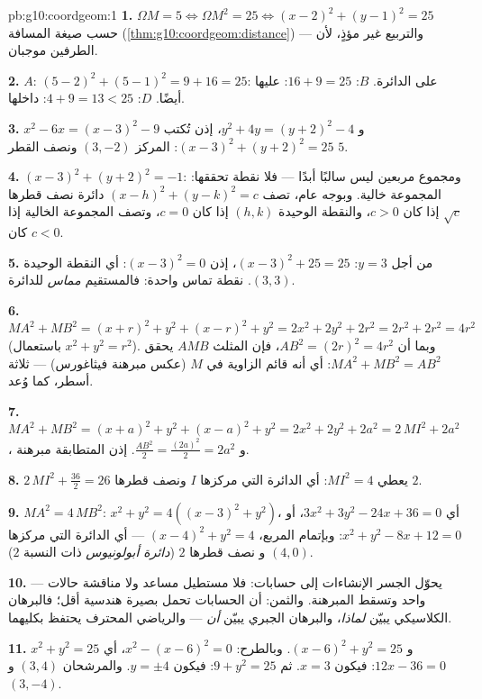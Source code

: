 \begin{solution}{pb:g10:coordgeom:1}
\textbf{1.} $\Omega M = 5 \iff \Omega M^2 = 25 \iff
(x - 2)^2 + (y - 1)^2 = 25$ حسب صيغة المسافة
(\cref{thm:g10:coordgeom:distance}) --- والتربيع غير مؤذٍ،
لأن الطرفين موجبان.

\textbf{2.} $A$: $(5-2)^2 + (5-1)^2 = 9 + 16 = 25$: على
الدائرة. $B$: $16 + 9 = 25$: عليها أيضًا. $D$: $4 + 9 = 13 < 25$:
داخلها.

\textbf{3.} $x^2 - 6x = (x - 3)^2 - 9$ و
$y^2 + 4y = (y + 2)^2 - 4$، إذن تُكتب 
$(x - 3)^2 + (y + 2)^2 = 25$: المركز $(3, -2)$ ونصف القطر $5$.

\textbf{4.} $(x - 3)^2 + (y + 2)^2 = -1$: ومجموع مربعين
ليس سالبًا أبدًا --- فلا نقطة تحققها: المجموعة خالية. وبوجه
عام، تصف $(x - h)^2 + (y - k)^2 = c$ دائرة نصف قطرها
$\sqrt c$ إذا كان $c > 0$، والنقطة الوحيدة $(h, k)$ إذا كان $c = 0$،
وتصف المجموعة الخالية إذا كان $c < 0$.

\textbf{5.} من أجل $y = 3$: $(x - 3)^2 + 25 = 25$، إذن
$(x - 3)^2 = 0$: أي النقطة الوحيدة $(3, 3)$. نقطة تماس واحدة:
فالمستقيم \emph{مماس} للدائرة.

\textbf{6.} $MA^2 + MB^2 = (x + r)^2 + y^2 + (x - r)^2 + y^2
= 2x^2 + 2y^2 + 2r^2 = 2r^2 + 2r^2 = 4r^2$ (باستعمال
$x^2 + y^2 = r^2$). وبما أن $AB^2 = (2r)^2 = 4r^2$، فإن المثلث
$AMB$ يحقق $MA^2 + MB^2 = AB^2$: أي أنه قائم الزاوية في $M$
(عكس مبرهنة فيثاغورس) --- ثلاثة أسطر، كما وُعد.

\textbf{7.} $MA^2 + MB^2 = (x + a)^2 + y^2 + (x - a)^2 + y^2
= 2x^2 + 2y^2 + 2a^2 = 2\,MI^2 + 2a^2$، و
$\frac{AB^2}{2} = \frac{(2a)^2}{2} = 2a^2$. إذن المتطابقة مبرهنة.

\textbf{8.} $2\,MI^2 + \frac{36}{2} = 26$ يعطي $MI^2 = 4$: أي
الدائرة التي مركزها  $I$ ونصف قطرها $2$.

\textbf{9.} $MA^2 = 4\,MB^2$:
$x^2 + y^2 = 4\left((x - 3)^2 + y^2\right)$، أي
$3x^2 + 3y^2 - 24x + 36 = 0$، أو
$x^2 + y^2 - 8x + 12 = 0$: وبإتمام المربع،
$(x - 4)^2 + y^2 = 4$ --- أي الدائرة التي مركزها $(4, 0)$ و
نصف قطرها $2$ (\emph{دائرة أبولونيوس} ذات النسبة $2$).

\textbf{10.} يحوّل الجسر الإنشاءات إلى
حسابات: فلا مستطيل مساعد ولا مناقشة حالات --- 
واحد وتسقط المبرهنة. والثمن: أن الحسابات
تحمل بصيرة هندسية أقل؛ فالبرهان الكلاسيكي يبيّن
\emph{لماذا}، والبرهان الجبري يبيّن \emph{أن} --- والرياضي
المحترف يحتفظ بكليهما.

\textbf{11.} $x^2 + y^2 = 25$ و $(x - 6)^2 + y^2 = 25$.
وبالطرح: $x^2 - (x - 6)^2 = 0$، أي $12x - 36 = 0$:
فيكون $x = 3$. ثم $9 + y^2 = 25$: فيكون $y = \pm 4$. والمرشحان
$(3, 4)$ و $(3, -4)$.


\end{solution}
